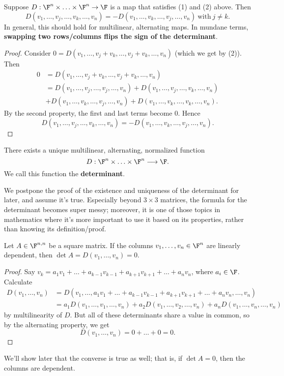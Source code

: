 \documentclass[math0540-lecture-notes.tex]{subfiles}
\begin{document}
\begin{proposition}{}
  Suppose $D:\F^n\times \ldots\times \F^n\to \F$ is a map that satisfies (1) and (2) above. Then \[
    D(v_1,\ldots,v_j,\ldots,v_k,\ldots,v_n)=-D(v_1,\ldots,v_k,\ldots,v_j,\ldots,v_n) ~\text{with}~
    j\neq k
  .\] In general, this should hold for multilinear, alternating maps. In mundane terms,
  \textbf{swapping two rows/columns flips the sign of the determinant}.
\end{proposition}
\begin{proof}[Proof]
  Consider $0=D(v_1,\ldots,v_j+v_k,\ldots,v_j+v_k,\ldots,v_n)$ (which we get by (2)). Then
  \begin{align*}
    0&=D(v_1,\ldots,v_j+v_k,\ldots,v_j+v_k,\ldots,v_n)\\
     &= D(v_1,\ldots,v_j,\ldots,v_j,\ldots,v_n)+D(v_1,\ldots,v_j,\ldots,v_k,\ldots,v_n) \\
     &+D(v_1,\ldots,v_k,\ldots,v_j,\ldots,v_n)+D(v_1,\ldots,v_k,\ldots,v_k,\ldots,v_n)
  .\end{align*}
  By the second property, the first and last terms become $0$. Hence \[
    D(v_1,\ldots,v_j,\ldots,v_k,\ldots,v_n)=-D(v_1,\ldots,v_k,\ldots,v_j,\ldots,v_n)
  .\] 
\end{proof}

\begin{theorem}[Determinant]{}
  There exists a unique multilinear, alternating, normalized function \[
    D:\F^n\times \ldots\times \F^n \longrightarrow \F
  .\] We call this function the \textbf{determinant}.
\end{theorem}

We postpone the proof of the existence and uniqueness of the determinant for later, and assume it's
true. Especially beyond $3\times 3$ matrices, the formula for the determinant becomes super messy;
moreover, it is one of those topics in mathematics where it's more important to use it based on its
properties, rather than knowing its definition/proof.

\begin{proposition}{}
  Let $A\in \F^{n,n}$ be a square matrix. If the columns $v_1,\ldots,v_n\in \F^n$ are linearly
  dependent, then $\det{A}=D(v_1,\ldots,v_n)=0$.
\end{proposition}
\begin{proof}[Proof]
  Say $v_k=a_1v_1+\ldots+a_{k-1}v_{k-1}+a_{k+1}v_{k+1}+\ldots+a_nv_n$, where $a_i\in \F$. Calculate
  \begin{align*}
    D(v_1,\ldots,v_n)&=
    D(v_1,\ldots,a_1v_1+\ldots+a_{k-1}v_{k-1}+a_{k+1}v_{k+1}+\ldots+a_nv_n,\ldots,v_n) \\
                     &=
 a_1D(v_1,\ldots,v_1,\ldots,v_n)+a_2D(v_1,\ldots,v_2,\ldots,v_n)+a_nD(v_1,\ldots,v_n,\ldots,v_n)
  \end{align*}
  by multilinearity of $D$. But all of these determinants share a value in common, so by the
  alternating property, we get \[
    D(v_1,\ldots,v_n)=0+\ldots+0=0
  .\] 
\end{proof}
We'll show later that the converse is true as well; that is, if $\det{A}=0$, then the columns are
dependent.
\end{document}
